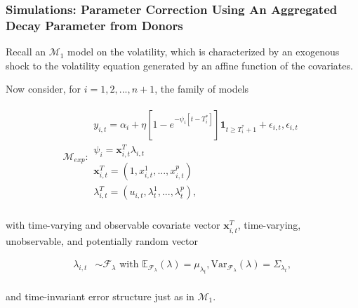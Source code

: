 \documentclass[9pt]{beamer}
\newcommand{\x}{\textbf{x}}
\def\mrm#1{\mathrm{#1}} %
\def\mc#1{\mathcal{#1}} %
\def\E{\mathbb{E}} %
\def\mc#1{\mathcal{#1}}
\theoremstyle{definition}
\begin{document}
\begin{frame}
    \fontsize{8pt}{9pt}
    
    \frametitle{Simulations: Parameter Correction Using An Aggregated Decay Parameter from Donors}
    
        
    Recall an \hyperlink{model_1}{$\mc{M}_1$} model on the volatility, which is characterized by an exogenous shock to the volatility equation generated by an affine function of the covariates.

    \bigskip

    Now consider, for $i=1,2,...,n+1$, the family of models
    
    \begin{align}
        \mc{M}_{exp} \colon 
    \begin{array}{l}
        y_{i,t} = \alpha_{i} + \eta[1 - e^{-\psi_{i}[t-T_{i}^{*}]}]\textbf{1}_{t\geq T_{i}^{*}+1} + \epsilon_{i,t}, \epsilon_{i,t} \\[.2cm]  
          \psi_{i} = \x^{T}_{i,t}\lambda_{i,t} \\[.2cm]
         \x_{i,t}^{T} = (1,x^{1}_{i,t},...,x^{p}_{i,t})\\[.2cm] 
         \lambda_{i,t}^{T} = (u_{i,t},\lambda^{1}_{t},...,\lambda^{p}_{t}),\\[.2cm]
        \end{array}
    \end{align}

    with time-varying and observable covariate vector $\x_{i,t}^{T}$, time-varying, unobservable, and potentially random vector
    
    \begin{align*}
    \lambda_{i,t} &\sim \mc{F}_{\lambda}\text{ with }  \E_{\mathcal{F}_{\lambda}}(\lambda) = \mu_{\lambda_{t}}, \mrm{Var}_{\mc{F}_{\lambda}}(\lambda) = \Sigma_{\lambda_{t}},\\
    \end{align*}

    and time-invariant error structure just as in $\mc{M}_{1}$.


    \end{frame}
\end{document}
